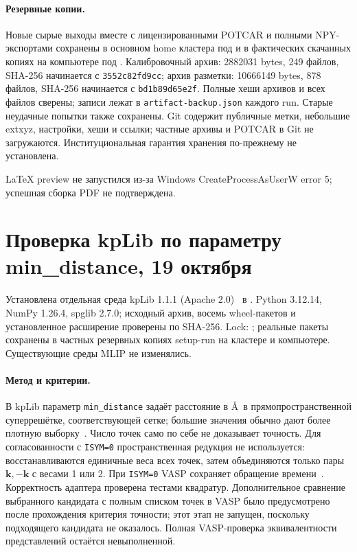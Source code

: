 \documentclass[11pt,a4paper]{article}
\begin{document}
\paragraph{Резервные копии.}
Новые сырые выходы вместе с лицензированными POTCAR и полными NPY-экспортами
сохранены в основном home кластера под
и в фактических скачанных копиях на компьютере под
.
Калибровочный архив: 2882031 bytes, 249 файлов, SHA-256 начинается с
\texttt{3552c82fd9cc}; архив разметки: 10666149 bytes, 878 файлов,
SHA-256 начинается с \texttt{bd1b89d65e2f}.
Полные хеши архивов и всех файлов сверены; записи лежат в
\texttt{artifact-backup.json} каждого run. Старые неудачные попытки
также сохранены. Git содержит публичные метки, небольшие extxyz,
настройки, хеши и ссылки; частные архивы и POTCAR в Git не загружаются.
Институциональная гарантия хранения по-прежнему не установлена.

LaTeX preview не запустился из-за Windows CreateProcessAsUserW error 5;
успешная сборка PDF не подтверждена.

\section{Проверка kpLib по параметру min\_distance, 19 октября}
\label{sec:kplib}
Установлена отдельная среда kpLib 1.1.1 (Apache 2.0)~\cite{kplib-release}
в .
Python 3.12.14, NumPy 1.26.4, spglib 2.7.0; исходный архив,
восемь wheel-пакетов и установленное расширение проверены по SHA-256.
Lock: ; реальные пакеты
сохранены в частных резервных копиях setup-run на кластере и компьютере.
Существующие среды MLIP не изменялись.

\paragraph{Метод и критерии.}
В kpLib параметр \texttt{min\_distance} задаёт расстояние в \AA\
в прямопространственной суперрешётке, соответствующей сетке;
большие значения обычно дают более плотную выборку~\cite{kplib-paper}.
Число точек само по себе не доказывает точность.
Для согласованности с \texttt{ISYM=0} пространственная редукция
не используется: восстанавливаются единичные веса всех точек,
затем объединяются только пары $\mathbf{k},-\mathbf{k}$ с весами 1 или 2.
При \texttt{ISYM=0} VASP сохраняет обращение времени~\cite{isym}.
Корректность адаптера проверена тестами квадратур. Дополнительное
сравнение выбранного кандидата с полным списком точек в VASP было
предусмотрено после прохождения критерия точности; этот этап не запущен,
поскольку подходящего кандидата не оказалось. Полная VASP-проверка
эквивалентности представлений остаётся невыполненной.
\end{document}
